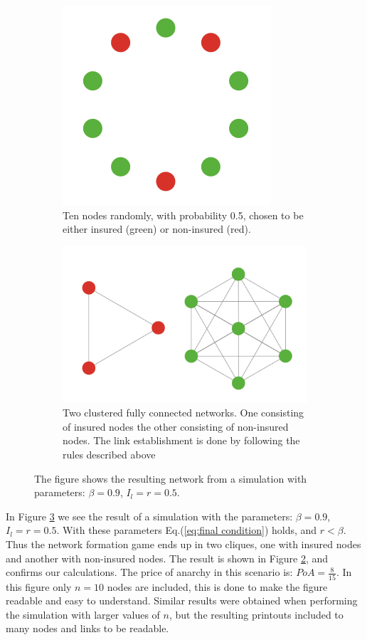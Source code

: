 \begin{figure}[h]
\centering
\begin{subfigure}{1.0\textwidth}
  \centering
  \includegraphics[width=0.5\linewidth]{../Figures/FirstSimulationStart.png}
  \caption{\label{fig:firstsimulation:a} Ten nodes randomly, with probability 0.5, chosen to be either insured (green) or non-insured (red).}
\end{subfigure}
\begin{subfigure}{1.0\textwidth}
  \centering
  \includegraphics[width=0.7\linewidth]{../Figures/FirstSimulationResult.png}
  \caption{\label{fig:firstsimulation:b} Two clustered fully connected networks. One consisting of insured nodes the other consisting of non-insured nodes. The link establishment is done by following the rules described above}
\end{subfigure}
\caption{\label{fig:firstsimulation} The figure shows the resulting network from a simulation with parameters: $\beta=0.9$, $I_{l}=r=0.5$.}
\end{figure}
In Figure \ref{fig:firstsimulation} we see the result of a simulation with the parameters: $\beta=0.9$, $I_{l}=r=0.5$. With these parameters Eq.(\ref{eq:final condition}) holds, and $r<\beta$. Thus the network formation game ends up in two cliques, one with insured nodes and another with non-insured nodes. The result is shown in Figure \ref{fig:firstsimulation:b}, and confirms our calculations.
The price of anarchy in this scenario is: $PoA=\frac{8}{15}$.
In this figure only $n=10$ nodes are included, this is done to make the figure readable and easy to understand.
Similar results were obtained when performing the simulation with larger values of $n$, but the resulting printouts included to many nodes and links to be readable. 

